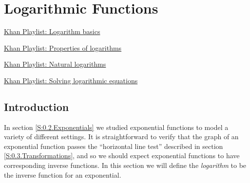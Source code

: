 \section{Logarithmic Functions} \label{S:0.4.Logarithms}


\vspace*{-14 pt}


\begin{web}
\item
    \href{https://www.khanacademy.org/math/algebra2/logarithms-tutorial/logarithm_basics/v/logarithms}{Khan
    Playlist: Logarithm basics}
\item
    \href{https://www.khanacademy.org/math/algebra2/logarithms-tutorial/logarithm_properties}{Khan
    Playlist: Properties of logarithms}
\item
    \href{https://www.khanacademy.org/math/algebra2/logarithms-tutorial/natural_logarithm}{Khan
    Playlist: Natural logarithms}
\item
    \href{https://www.khanacademy.org/math/algebra2/exponential_and_logarithmic_func/logarithmic-equations/v/solving-logarithmic-equations_dup_1}{Khan
    Playlist: Solving logarithmic equations}
\end{web}

\nin \hrulefill


\subsection*{Introduction}

In section \ref{S:0.2.Exponentials} we studied exponential functions to model a
variety of different settings.  It is straightforward to verify that the graph of an
exponential function passes the ``horizontal line test'' described in section
\ref{S:0.3.Transformations}, and so we should expect exponential functions to have
corresponding inverse functions.  In this section we will define the \emph{logarithm} to
be the inverse function for an exponential.



